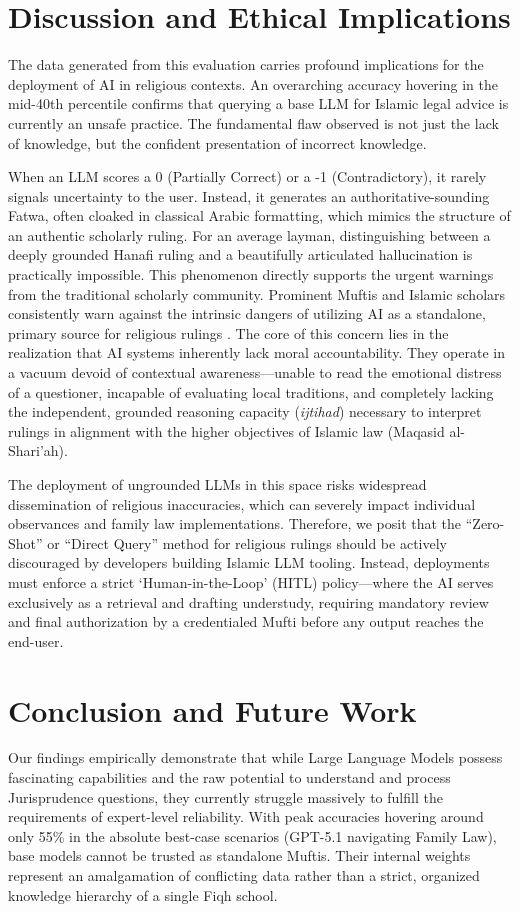 \section{Discussion and Ethical Implications}
The data generated from this evaluation carries profound implications for the deployment of AI in religious contexts. An overarching accuracy hovering in the mid-40th percentile confirms that querying a base LLM for Islamic legal advice is currently an unsafe practice. The fundamental flaw observed is not just the lack of knowledge, but the confident presentation of incorrect knowledge. 

When an LLM scores a 0 (Partially Correct) or a -1 (Contradictory), it rarely signals uncertainty to the user. Instead, it generates an authoritative-sounding Fatwa, often cloaked in classical Arabic formatting, which mimics the structure of an authentic scholarly ruling. For an average layman, distinguishing between a deeply grounded Hanafi ruling and a beautifully articulated hallucination is practically impossible. This phenomenon directly supports the urgent warnings from the traditional scholarly community. Prominent Muftis and Islamic scholars consistently warn against the intrinsic dangers of utilizing AI as a standalone, primary source for religious rulings \cite{dangerai2025}. The core of this concern lies in the realization that AI systems inherently lack moral accountability. They operate in a vacuum devoid of contextual awareness---unable to read the emotional distress of a questioner, incapable of evaluating local traditions, and completely lacking the independent, grounded reasoning capacity (\textit{ijtihad}) necessary to interpret rulings in alignment with the higher objectives of Islamic law (Maqasid al-Shari'ah).

The deployment of ungrounded LLMs in this space risks widespread dissemination of religious inaccuracies, which can severely impact individual observances and family law implementations. Therefore, we posit that the ``Zero-Shot'' or ``Direct Query'' method for religious rulings should be actively discouraged by developers building Islamic LLM tooling. Instead, deployments must enforce a strict `Human-in-the-Loop' (HITL) policy—where the AI serves exclusively as a retrieval and drafting understudy, requiring mandatory review and final authorization by a credentialed Mufti before any output reaches the end-user.

\section{Conclusion and Future Work}
Our findings empirically demonstrate that while Large Language Models possess fascinating capabilities and the raw potential to understand and process Jurisprudence questions, they currently struggle massively to fulfill the requirements of expert-level reliability. With peak accuracies hovering around only 55\% in the absolute best-case scenarios (GPT-5.1 navigating Family Law), base models cannot be trusted as standalone Muftis. Their internal weights represent an amalgamation of conflicting data rather than a strict, organized knowledge hierarchy of a single Fiqh school.

